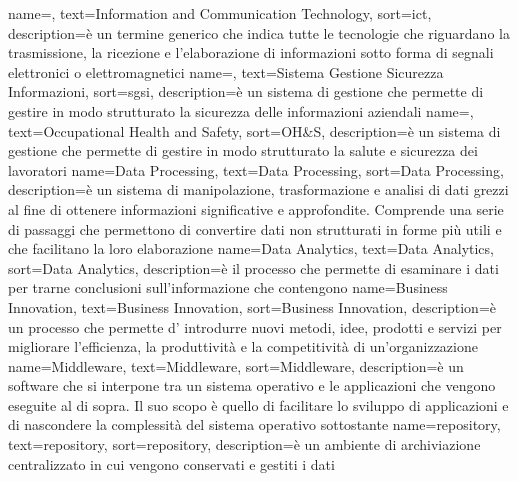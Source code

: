  {
    name=,
    text=Information and Communication Technology,
    sort=ict,
    description={è un termine generico che indica tutte le tecnologie che riguardano la trasmissione, la ricezione e l'elaborazione di informazioni sotto forma di segnali elettronici o elettromagnetici}
}
 {
    name=,
    text=Sistema Gestione Sicurezza Informazioni,
    sort=sgsi,
    description={è un sistema di gestione che permette di gestire in modo strutturato la sicurezza delle informazioni aziendali}
}
 {
    name=,
    text=Occupational Health and Safety,
    sort=OH\&S,
    description={è un sistema di gestione che permette di gestire in modo strutturato la salute e sicurezza dei lavoratori}
}
{
    name={Data Processing},
    text=Data Processing,
    sort=Data Processing,
    description={è un sistema di manipolazione, trasformazione e analisi di dati grezzi al fine di ottenere informazioni significative e approfondite. Comprende una serie di passaggi che permettono di convertire dati non strutturati in forme più utili e che facilitano la loro elaborazione}
}
{
    name={Data Analytics},
    text=Data Analytics,
    sort=Data Analytics,
    description={è il processo che permette di esaminare i dati per trarne conclusioni sull'informazione che contengono}
}
{
    name={Business Innovation},
    text=Business Innovation,
    sort=Business Innovation,
    description={è un processo che permette d' introdurre nuovi metodi, idee, prodotti e servizi per migliorare l'efficienza, la produttività e la competitività di un'organizzazione}
}
{
    name={Middleware},
    text=Middleware,
    sort=Middleware,
    description={è un software che si interpone tra un sistema operativo e le applicazioni che vengono eseguite al di sopra. Il suo scopo è quello di facilitare lo sviluppo di applicazioni e di nascondere la complessità del sistema operativo sottostante}
}
{
    name={repository},
    text=repository,
    sort=repository,
    description={è un ambiente di archiviazione centralizzato in cui vengono conservati e gestiti i dati}
}
